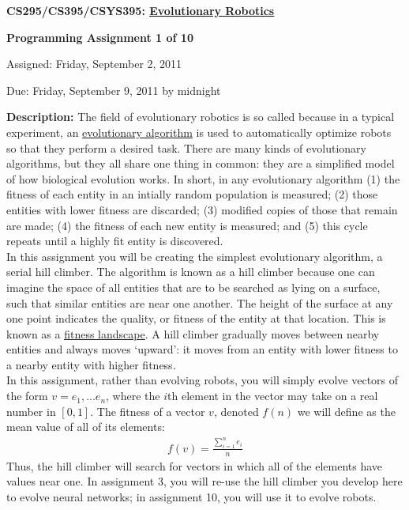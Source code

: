 \documentclass[12pt]{article}
\begin{document}
\centerline{\bf \Large CS295/CS395/CSYS395: \href{CS295_395_Syllabus.pdf}{\underline{Evolutionary Robotics}}}

\vspace{0.5cm}

\centerline{\bf \large Programming Assignment 1 of 10}

\vspace{0.5cm}

\centerline{\large Assigned: Friday, September 2, 2011}

\vspace{0.5cm}

\centerline{\large Due: Friday, September 9, 2011 by midnight}

\vspace{0.5cm}

\noindent \textbf{Description:} The field of evolutionary robotics is so called because in a typical experiment, an \underline{evolutionary algorithm} is used to automatically optimize robots so that they perform a desired task. There are many kinds of evolutionary algorithms, but they all share one thing in common: they are a simplified model of how biological evolution works. In short, in any evolutionary algorithm (1) the fitness of each entity in an intially random population is measured; (2) those entities with lower fitness are discarded; (3) modified copies of those that remain are made; (4) the fitness of each new entity is measured; and (5) this cycle repeats until a highly fit entity is discovered. \\

In this assignment you will be creating the simplest evolutionary algorithm, a serial hill climber. The algorithm is known as a hill climber because one can imagine the space of all entities that are to be searched as lying on a surface, such that similar entities are near one another. The height of the surface at any one point indicates the quality, or fitness of the entity at that location. This is known as a
\href{http://en.wikipedia.org/wiki/Fitness_landscape}
{\underline{fitness landscape}}. A hill climber gradually moves between nearby entities and always moves `upward': it moves from an entity with lower fitness to a nearby entity with higher fitness. \\

In this assignment, rather than evolving robots, you will simply evolve vectors of the form $v = {e_1, \ldots e_n}$, where the $i$th element in the vector may take on a real number in $[0,1]$. The fitness of a vector $v$, denoted $f(n)$ we will define as the mean value of all of its elements:
\begin{eqnarray}
f(v) = \frac{\sum_{i=1}^{n}e_i}{n}
\end{eqnarray}
Thus, the hill climber will search for vectors in which all of the elements have values near one. In assignment 3, you will re-use the hill climber you develop here to evolve neural networks; in assignment 10, you will use it to evolve robots. \\
\end{document}
